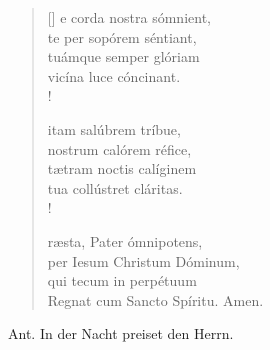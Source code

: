 \begin{verse}[\versewidth]
e corda nostra sómnient,\\
te per sopórem séntiant,\\
tuámque semper glóriam\\
vicína luce cóncinant.\\!


itam salúbrem tríbue,\\
nostrum calórem réfice,\\
tætram noctis calíginem\\
tua collústret cláritas.\\!

ræsta, Pater ómnipotens,\\
per Iesum Christum Dóminum,\\
qui tecum in perpétuum\\
Regnat cum Sancto Spíritu. Amen.

\end{verse}



\def\greinitialformat#1{{\fontsize{40}{40}\selectfont #1}}
\gresetfirstlineaboveinitial{\small \textcolor{red}{4 91 134 }}{}
\setaboveinitialseparation{0.72mm}

Ant. In der Nacht preiset den Herrn.

\vspace{0.6cm}

\def\greinitialformat#1{{\fontsize{40}{40}\selectfont #1}}
\gresetfirstlineaboveinitial{\small \textcolor{red}{T. P. }}{}
\setaboveinitialseparation{0.72mm}


 

